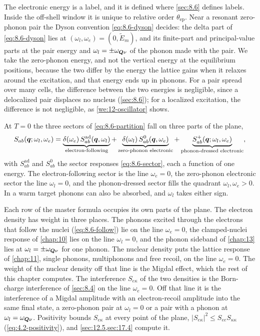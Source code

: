 The electronic energy is a label, and it is defined where \cref{sec:8.6} defines labels. Inside the off-shell window it is unique to relative order $\theta_{\mathrm{ep}}$. Near a resonant zero-phonon pair the Dyson convention \cref{eq:8.6-dyson} decides: the delta part of \cref{eq:8.6-dyson} lies at $(\omega_l, \omega_e) = (0, \tilde E_m)$, and its finite-part and principal-value parts at the pair energy and $\omega_l = \pm\omega_{\bm{Q}\nu}$ of the phonon made with the pair. We take the zero-phonon energy, and not the vertical energy at the equilibrium positions, because the two differ by the energy the lattice gains when it relaxes around the excitation, and that energy ends up in phonons. For a pair spread over many cells, the difference between the two energies is negligible, since a delocalized pair displaces no nucleus (\cref{sec:8.6}); for a localized excitation, the difference is not negligible, as \cref{we:12-oscillator} shows.

At $T = 0$ the three sectors of \cref{eq:8.6-partition} fall on three parts of the plane,
\begin{equation}
  S_{ab}(\bm{q};\omega_l,\omega_e) = \underbrace{\delta(\omega_e)\,S^{\mathrm{ad}}_{ab}(\bm{q},\omega_l)}_{\text{electron-following}} + \underbrace{\delta(\omega_l)\,S^0_{ab}(\bm{q},\omega_e)}_{\text{zero-phonon electronic}} + \underbrace{S^+_{ab}(\bm{q};\omega_l,\omega_e)}_{\text{phonon-dressed electronic}} ,
  \label{eq:12.1-sectors}
\end{equation}
with $S^{\mathrm{ad}}_{ab}$ and $S^0_{ab}$ the sector responses \cref{eq:8.6-sector}, each a function of one energy. The electron-following sector is the line $\omega_e = 0$, the zero-phonon electronic sector the line $\omega_l = 0$, and the phonon-dressed sector fills the quadrant $\omega_l, \omega_e > 0$. In a warm target phonons can also be absorbed, and $\omega_l$ takes either sign.

Each row of the master formula occupies its own parts of the plane. The electron density has weight in three places. The phonons excited through the electrons that follow the nuclei (\cref{eq:8.6-follow}) lie on the line $\omega_e = 0$, the clamped-nuclei response of \cref{chap:10} lies on the line $\omega_l = 0$, and the phonon sideband of \cref{chap:13} lies at $\omega_l = \pm\omega_{\bm{Q}\nu}$ for one phonon. The nuclear density puts the lattice response of \cref{chap:11}, single phonons, multiphonons and free recoil, on the line $\omega_e = 0$. The weight of the nuclear density off that line is the Migdal effect, which the rest of this chapter computes. The interference $S_{e\kappa}$ of the two densities is the Born-charge interference of \cref{sec:8.4} on the line $\omega_e = 0$. Off that line it is the interference of a Migdal amplitude with an electron-recoil amplitude into the same final state, a zero-phonon pair at $\omega_l = 0$ or a pair with a phonon at $\omega_l = \omega_{\bm{Q}\nu}$. Positivity bounds $S_{e\kappa}$ at every point of the plane, $|S_{e\kappa}|^2 \le S_{ee}S_{\kappa\kappa}$ (\cref{eq:4.2-positivity}), and \cref{sec:12.5,sec:17.4} compute it.

